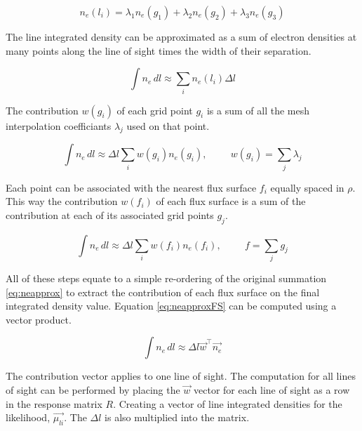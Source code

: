 \begin{equation}
  n_e(l_i) = \lambda_1 n_e(g_1) + \lambda_2 n_e(g_2) + \lambda_3 n_e(g_3)
\end{equation}

\noindent The line integrated density can be approximated as a sum of electron densities at many points along the line of sight times the width of their separation.

\begin{equation}
  \int n_e \, dl \approx \sum_i n_e(l_i) \Delta l
  \label{eq:neapprox}
\end{equation}

\noindent The contribution $w(g_i)$ of each grid point $g_i$ is a sum of all the mesh interpolation coefficiants $\lambda_j$ used on that point.

\begin{equation}
  \int n_e \, dl \approx \Delta l \sum_i w(g_i) n_e(g_i), \hspace{1cm} w(g_i) = \sum_j \lambda_j  
\end{equation}

\noindent Each point can be associated with the nearest flux surface $f_i$ equally spaced in $\rho$. This way the contribution $w(f_i)$ of each flux surface is a sum of the contribution at each of its associated grid points $g_j$.

\begin{equation}
  \int n_e \, dl \approx \Delta l \sum_i w(f_i) n_e(f_i), \hspace{1cm} f = \sum_j g_j
  \label{eq:neapproxFS}
\end{equation}

\noindent All of these steps equate to a simple re-ordering of the original summation \ref{eq:neapprox} to extract the contribution of each flux surface on the final integrated density value. Equation \ref{eq:neapproxFS} can be computed using a vector product.

\begin{equation}
  \int n_e \, dl \approx \Delta l \vec{w}^{\top} \vec{n_e}
\end{equation}

\noindent The contribution vector applies to one line of sight. The computation for all lines of sight can be performed by placing the $\vec{w}$ vector for each line of sight as a row in the response matrix $R$. Creating a vector of line integrated densities for the likelihood, $\vec{\mu_{li}}$. The $\Delta l$ is also multiplied into the matrix.

